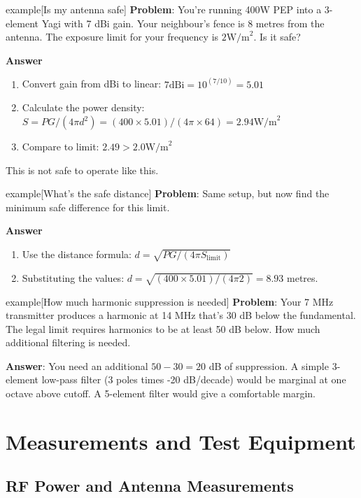 \documentclass{article}
\begin{document}
\begin{callout}{example}[Is my antenna safe]
    \textbf{Problem}: You're running 400W PEP into a 3-element Yagi with 7 dBi gain. Your neighbour's fence is 8 metres from the antenna. The exposure limit for your frequency is $2 \text{W/m}^2$. Is it safe?

    \textbf{Answer}
    \begin{enumerate}
        \item Convert gain from dBi to linear: $7 \text{dBi}=10^(7/10)=5.01$
        \item Calculate the power density: $S=PG/(4\pi d^2)=(400\times 5.01)/(4\pi \times 64)=2.94 \text{W/m}^2$
        \item Compare to limit: $2.49>2.0 \text{W/m}^2$
    \end{enumerate}
    This is not safe to operate like this.
\end{callout}

\begin{callout}{example}[What's the safe distance]
    \textbf{Problem}: Same setup, but now find the minimum safe difference for this limit.

    \textbf{Answer}
    \begin{enumerate}
        \item Use the distance formula: $d=\sqrt{PG/(4\pi S_{\text{limit}})}$
        \item Substituting the values: $d=\sqrt{(400\times 5.01)/(4\pi 2)}=8.93$ metres.
    \end{enumerate}
\end{callout}

\begin{callout}{example}[How much harmonic suppression is needed]
    \textbf{Problem}: Your 7 MHz transmitter produces a harmonic at 14 MHz that's 30 dB below the fundamental. The legal limit requires harmonics to be at least 50 dB below. How much additional filtering is needed.

    \textbf{Answer}: You need an additional $50-30=20$ dB of suppression. A simple 3-element low-pass filter (3 poles times -20 dB/decade) would be marginal at one octave above cutoff. A 5-element filter would give a comfortable margin.
\end{callout}

\section{Measurements and Test Equipment}
\subsection{RF Power and Antenna Measurements}
\end{document}
